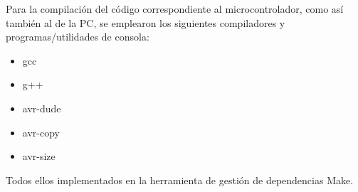  Para la compilación del código correspondiente al microcontrolador,
 como así también al de la PC, se emplearon los siguientes compiladores y programas/utilidades
 de consola:
 \begin{itemize}
   \item gcc 
   \item g++ 
   \item avr-dude 
   \item avr-copy
   \item avr-size
 \end{itemize}
 Todos ellos implementados en la herramienta de gestión de dependencias Make.

